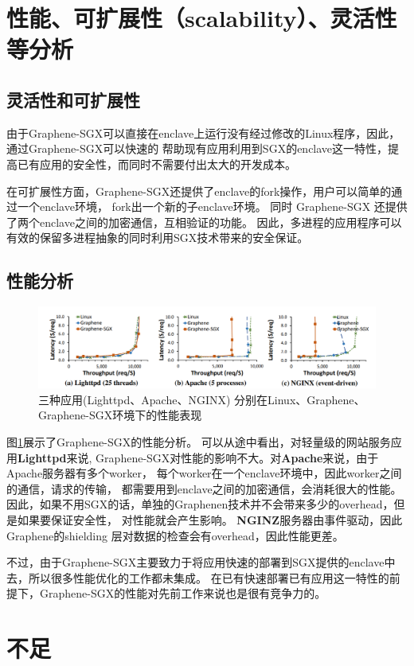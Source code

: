 \documentclass{article}
\begin{document}
\section{性能、可扩展性（scalability）、灵活性等分析}
\subsection{灵活性和可扩展性}
由于Graphene-SGX可以直接在enclave上运行没有经过修改的Linux程序，因此，通过Graphene-SGX可以快速的
帮助现有应用利用到SGX的enclave这一特性，提高已有应用的安全性，而同时不需要付出太大的开发成本。

在可扩展性方面，Graphene-SGX还提供了enclave的fork操作，用户可以简单的通过一个enclave环境，
fork出一个新的子enclave环境。
同时 Graphene-SGX 还提供了两个enclave之间的加密通信，互相验证的功能。
因此，多进程的应用程序可以有效的保留多进程抽象的同时利用SGX技术带来的安全保证。


\subsection{性能分析}
\begin{figure}[]
    \centering
    \includegraphics[width=1\textwidth]{1.png}    
    \caption{三种应用(Lighttpd、Apache、NGINX)
    分别在Linux、Graphene、Graphene-SGX环境下的性能表现}
    \label{23333}
\end{figure}
图\ref{23333}展示了Graphene-SGX的性能分析。
可以从途中看出，对轻量级的网站服务应用\textbf{Lighttpd}来说,
Graphene-SGX对性能的影响不大。对\textbf{Apache}来说，由于Apache服务器有多个worker，
每个worker在一个enclave环境中，因此worker之间的通信，请求的传输，
都需要用到enclave之间的加密通信，会消耗很大的性能。
因此，如果不用SGX的话，单独的Graphenen技术并不会带来多少的overhead，但是如果要保证安全性，
对性能就会产生影响。
\textbf{NGINZ}服务器由事件驱动，因此Graphene的shielding 层对数据的检查会有overhead，因此性能更差。

不过，由于Graphene-SGX主要致力于将应用快速的部署到SGX提供的enclave中去，所以很多性能优化的工作都未集成。
在已有快速部署已有应用这一特性的前提下，Graphene-SGX的性能对先前工作来说也是很有竞争力的。


\section{不足}
\end{document}
